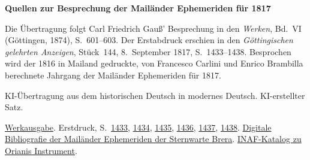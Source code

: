 \clearpage\thispagestyle{empty}
\begin{center}\Large\bfseries Quellen zur Besprechung der Mailänder Ephemeriden für 1817\end{center}

Die Übertragung folgt Carl Friedrich Gauß’ Besprechung in den \emph{Werken}, Bd.~VI (Göttingen, 1874), S.~601--603. Der Erstabdruck erschien in den \emph{Göttingischen gelehrten Anzeigen}, Stück~144, 8.~September 1817, S.~1433--1438. Besprochen wird der 1816 in Mailand gedruckte, von Francesco Carlini und Enrico Brambilla berechnete Jahrgang der Mailänder Ephemeriden für 1817.

KI-Übertragung aus dem historischen Deutsch in modernes Deutsch. KI-erstellter Satz.

\href{https://gdz.sub.uni-goettingen.de/id/PPN236007467}{Werkausgabe}. Erstdruck, S.~\href{https://images.p.sub.uni-goettingen.de/iiif/image/gdz:PPN319721507_1817:00001447/full/1650,/0/default.jpg}{1433}, \href{https://images.p.sub.uni-goettingen.de/iiif/image/gdz:PPN319721507_1817:00001448/full/1650,/0/default.jpg}{1434}, \href{https://images.p.sub.uni-goettingen.de/iiif/image/gdz:PPN319721507_1817:00001449/full/1650,/0/default.jpg}{1435}, \href{https://images.p.sub.uni-goettingen.de/iiif/image/gdz:PPN319721507_1817:00001450/full/1650,/0/default.jpg}{1436}, \href{https://images.p.sub.uni-goettingen.de/iiif/image/gdz:PPN319721507_1817:00001451/full/1650,/0/default.jpg}{1437}, \href{https://images.p.sub.uni-goettingen.de/iiif/image/gdz:PPN319721507_1817:00001452/full/1650,/0/default.jpg}{1438}. \href{https://www1.brera.inaf.it/~mario.carpino/Biblioteca_Digitale/Effemeridi_Milano/}{Digitale Bibliografie der Mailänder Ephemeriden der Sternwarte Brera}. \href{https://www.beniculturali.inaf.it/opac/pst-iccd/circolo-moltiplicatore_13070}{INAF-Katalog zu Orianis Instrument}.

\clearpage
